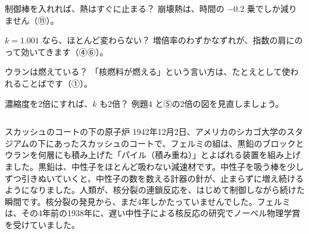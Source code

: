 \begin{tsumazuki}{制御棒を入れれば、熱はすぐに止まる？}
崩壊熱は、時間の $-0.2$ 乗でしか減りません（⑪）。
\end{tsumazuki}

\begin{tsumazuki}{$k=1.001$ なら、ほとんど変わらない？}
増倍率のわずかなずれが、指数の肩にのって効いてきます（④⑥）。
\end{tsumazuki}

\begin{tsumazuki}{ウランは燃えている？}
「核燃料が燃える」という言い方は、たとえとして使われることばです（①）。
\end{tsumazuki}

\begin{tsumazuki}{濃縮度を2倍にすれば、$k$ も2倍？}
例題4 と⑤の2倍の図を見直しましょう。
\end{tsumazuki}

\begin{column}{スカッシュのコートの下の原子炉}
1942年12月2日、アメリカのシカゴ大学のスタジアムの下にあったスカッシュのコートで、フェルミの組は、黒鉛のブロックとウランを何層にも積み上げた「パイル（積み重ね）」とよばれる装置を組み上げました。黒鉛は、中性子をほとんど吸わない減速材です。中性子を吸う棒を少しずつ引きぬいていくと、中性子の数を数える計器の針が、止まらずに増え続けるようになりました。人類が、核分裂の連鎖反応を、はじめて制御しながら続けた瞬間です。核分裂の発見から、まだ4年しかたっていませんでした。フェルミは、その4年前の1938年に、遅い中性子による核反応の研究でノーベル物理学賞を受けていました。
\end{column}

